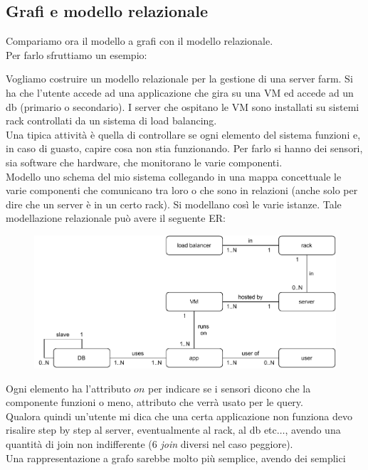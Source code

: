 \documentclass[a4paper,12pt, oneside]{book}
\begin{document}
\subsection{Grafi e modello relazionale}
Compariamo ora il modello a grafi con il modello relazionale.\\
Per farlo sfruttiamo un esempio: 
\begin{esempio}
  Vogliamo costruire un modello relazionale per la gestione di una server
  farm. Si ha che l'utente accede ad una applicazione che gira su una VM ed
  accede ad un db (primario o secondario). I server che ospitano le VM sono
  installati su sistemi rack controllati da un sistema di load balancing.\\
  Una tipica attività è quella di controllare se ogni elemento del sistema
  funzioni e, in caso di guasto, capire cosa non stia funzionando. Per farlo si
  hanno dei sensori, sia software che hardware, che monitorano le varie
  componenti. \\
  Modello uno schema del mio sistema collegando in una mappa concettuale le
  varie componenti che comunicano tra loro o che sono in relazioni (anche solo
  per dire che un server è in un certo rack). Si modellano così le varie
  istanze. Tale modellazione relazionale può avere il seguente ER:
  \begin{figure}[H]
    \centering
    \includegraphics[scale = 0.8]{img/er.pdf}
  \end{figure}
  Ogni elemento ha l'attributo $on$ per indicare se i sensori dicono che la
  componente funzioni o meno, attributo che verrà usato per le query.\\
  Qualora quindi un'utente mi dica che una certa applicazione non funziona devo
  risalire step by step al server, eventualmente al rack, al db etc$\ldots$,
  avendo una quantità di join non indifferente (6 \textit{join} diversi nel caso
  peggiore).\\
  Una rappresentazione a grafo sarebbe molto più semplice, avendo dei semplici

\end{esempio}
\end{document}
